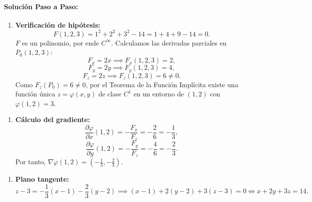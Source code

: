 \documentclass[11pt,a4paper]{article}
\begin{document}
\paragraph{Solución Paso a Paso:}\par
\begin{enumerate}[label=\textbf{\arabic*.}]
\item \textbf{Verificación de hipótesis:}
\begin{equation*}
F(1,2,3) = 1^2 + 2^2 + 3^2 - 14 = 1 + 4 + 9 - 14 = 0.
\end{equation*}
$F$ es un polinomio, por ende $C^\infty$.
Calculamos las derivadas parciales en $P_0(1,2,3)$:
\begin{equation*}
F_x = 2x \implies F_x(1,2,3) = 2,
\end{equation*}
\begin{equation*}
F_y = 2y \implies F_y(1,2,3) = 4,
\end{equation*}
\begin{equation*}
F_z = 2z \implies F_z(1,2,3) = 6 \neq 0.
\end{equation*}
Como $F_z(P_0) = 6 \neq 0$, por el Teorema de la Función Implícita existe una función única $z = \varphi(x,y)$ de clase $C^1$ en un entorno de $(1,2)$ con $\varphi(1,2) = 3$.
\end{enumerate}

\begin{enumerate}[label=\textbf{\arabic*.}]
\item \textbf{Cálculo del gradiente:}
\begin{equation*}
\frac{\partial \varphi}{\partial x}(1,2) = -\frac{F_x}{F_z} = -\frac{2}{6} = -\frac{1}{3},
\end{equation*}
\begin{equation*}
\frac{\partial \varphi}{\partial y}(1,2) = -\frac{F_y}{F_z} = -\frac{4}{6} = -\frac{2}{3}.
\end{equation*}
Por tanto, $\nabla\varphi(1,2) = \left(-\frac{1}{3}, -\frac{2}{3}\right)$.
\end{enumerate}

\begin{enumerate}[label=\textbf{\arabic*.}]
\item \textbf{Plano tangente:}
\begin{equation*}
z - 3 = -\frac{1}{3}(x - 1) - \frac{2}{3}(y - 2) \implies (x - 1) + 2(y - 2) + 3(z - 3) = 0 \iff x + 2y + 3z = 14.
\end{equation*}
\end{enumerate}
\end{document}
